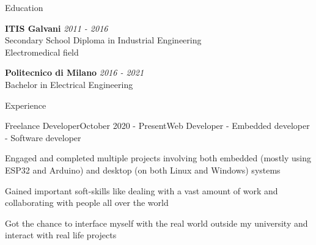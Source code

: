 \documentclass{resume} %
\begin{document}

\begin{rSection}{Education}

  {\bf ITIS Galvani} \hfill {\em 2011 - 2016} \\
  Secondary School Diploma in Industrial Engineering \smallskip \\
  Electromedical field

    {\bf Politecnico di Milano} \hfill {\em 2016 - 2021} \\
  Bachelor in Electrical Engineering \\

\end{rSection}


\begin{rSection}{Experience}

  \begin{rSubsection}{Freelance Developer}{October 2020 - Present}{Web Developer - Embedded developer - Software developer}

    \item Engaged and completed multiple projects involving both embedded (mostly using ESP32 and Arduino) and desktop (on both Linux and Windows) systems
    \item Gained important soft-skills like dealing with a vast amount of work and collaborating with people all over the world
    \item Got the chance to interface myself with the real world outside my university and interact with real life projects

  \end{rSubsection}

\end{rSection}

\end{document}
